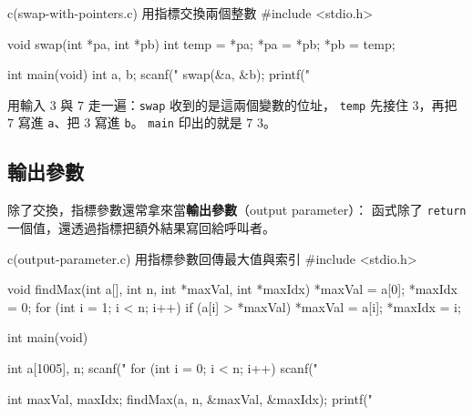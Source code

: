 \begin{center}
\label{fig:ch09-pointer-swap}
\end{center}

\begin{example}{c}{(swap-with-pointers.c) 用指標交換兩個整數}
#include <stdio.h>

void swap(int *pa, int *pb) {
    int temp = *pa;
    *pa = *pb;
    *pb = temp;
}

int main(void) {
    int a, b;
    scanf("%
    swap(&a, &b);
    printf("%
}
\end{example}


用輸入 $3$ 與 $7$ 走一遍：\texttt{swap} 收到的是這兩個變數的位址，
\texttt{temp} 先接住 $3$，再把 $7$ 寫進 \texttt{a}、把 $3$ 寫進
\texttt{b}。 \texttt{main} 印出的就是 $7$ $3$。

\subsection{輸出參數}

除了交換，指標參數還常拿來當\textbf{輸出參數}（output parameter）：
函式除了 \texttt{return} 一個值，還透過指標把額外結果寫回給呼叫者。

\begin{example}{c}{(output-parameter.c) 用指標參數回傳最大值與索引}
#include <stdio.h>

void findMax(int a[], int n, int *maxVal, int *maxIdx) {
    *maxVal = a[0];
    *maxIdx = 0;
    for (int i = 1; i < n; i++) {
        if (a[i] > *maxVal) {
            *maxVal = a[i];
            *maxIdx = i;
        }
    }
}

int main(void) {
    int a[1005], n;
    scanf("%
    for (int i = 0; i < n; i++) {
        scanf("%
    }

    int maxVal, maxIdx;
    findMax(a, n, &maxVal, &maxIdx);
    printf("%
}
\end{example}

